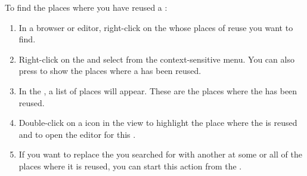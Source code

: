 To find the places where you have reused a \gdcase{}:
\begin{enumerate}
\item In a browser or editor, right-click on the \gdcase{} whose places of reuse  you want to find.
\item Right-click on the \gdcase{}  and select  from the context-sensitive menu. You can also press  to show the places where a \gdcase{} has been reused.
\item In the , a list of places will appear.
These are the places where the \gdcase{} has been reused. 
\item Double-click on a \gdcase{} icon in the view to highlight the place where the \gdcase{} is reused  and to open the editor for this \gdcase{}.
\item  If you want to replace the \gdcase{} you searched for with another \gdcase{} at some or all of the places where it is reused, you can start this action from the  \gdsearchresultview{} .
\end{enumerate}
